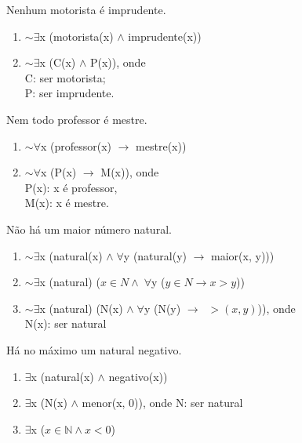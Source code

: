 \bigskip
\begin{exemplo} Nenhum motorista é imprudente.
\end{exemplo}

\begin{enumerate}[label=(\roman*)]
    \item $\sim \exists$x (motorista(x) $\land$ imprudente(x))
    \item $\sim \exists$x (C(x) $\land$ P(x)), onde\\
    C: ser motorista;\\
    P: ser imprudente.
\end{enumerate}

\bigskip
\begin{exemplo} Nem todo professor é mestre.
\end{exemplo}

\begin{enumerate}[label=(\roman*)]
    \item $\sim \forall$x (professor(x) $\to$ mestre(x))
    \item $\sim \forall$x (P(x) $\to$ M(x)), onde\\
    P(x): x é professor,
    \\M(x): x é mestre.
\end{enumerate}

\bigskip
\begin{exemplo} Não há um maior número natural.
\end{exemplo}

\begin{enumerate}[label=(\roman*)]
    \item $\sim \exists$x (natural(x) $\land \; \forall$y (natural(y) $\to$ maior(x, y)))
    \item $\sim \exists$x (natural) ($x \in N \land \; \forall$y ($y \in N \to x > y$))
    \item $\sim \exists$x (natural) (N(x) $\land \; \forall$y (N(y) $\to \;\; > (x, y)$)), onde\\
    N(x): ser natural
\end{enumerate}

\bigskip
\begin{exemplo} Há no máximo um natural negativo.
\end{exemplo}

\begin{enumerate}[label=(\roman*)]
    \item \underline{$\exists$}x (natural(x) $\land$ negativo(x))
    \item \underline{$\exists$}x (N(x) $\land$ menor(x, 0)), onde N: ser natural
    \item \underline{$\exists$}x ($x \in \mathbb{N} \land x < 0$)
\end{enumerate}

